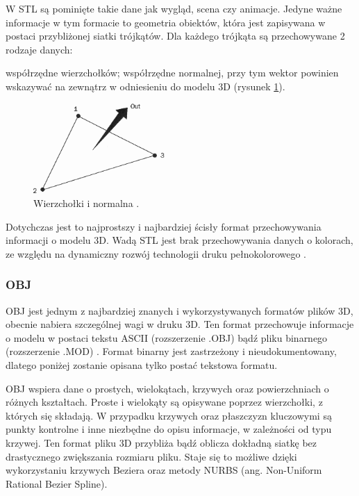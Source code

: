 W STL są pominięte takie dane jak wygląd, scena czy animacje. Jedyne ważne informacje w tym formacie to geometria obiektów, która jest zapisywana w postaci przybliżonej siatki trójkątów. Dla każdego trójkąta są przechowywane 2 rodzaje danych:
\begin{itemize}
\itemi współrzędne wierzchołków;
\itemi współrzędne normalnej, przy tym wektor powinien wskazywać na zewnątrz w odniesieniu do modelu 3D (rysunek \ref{rys6}).
\end{itemize}
\begin{figure}[H]
		\centering
 		\includegraphics[width=5.0cm]{vertices-and-normal.png}
    	\caption{Wierzchołki i normalna \cite{stlinfo}.}
 		\label{rys6}
\end{figure}
Dotychczas jest to najprostszy i najbardziej ścisły format przechowywania informacji o modelu 3D. Wadą STL jest brak przechowywania danych o kolorach, ze względu na dynamiczny rozwój technologii druku pełnokolorowego \cite{stlinfo}.

\subsubsection{OBJ}
OBJ jest jednym z najbardziej znanych i wykorzystywanych formatów plików 3D, obecnie nabiera szczególnej wagi w druku 3D. Ten format przechowuje informacje o modelu w postaci tekstu ASCII (rozszerzenie .OBJ) bądź pliku binarnego (rozszerzenie .MOD) \cite{objinfo}.
Format binarny jest zastrzeżony i nieudokumentowany, dlatego poniżej zostanie opisana tylko postać tekstowa formatu.

OBJ wspiera dane o prostych, wielokątach, krzywych oraz powierzchniach o różnych kształtach. Proste i wielokąty są opisywane poprzez wierzchołki, z których się składają. W przypadku krzywych oraz płaszczyzn kluczowymi są punkty kontrolne i inne niezbędne do opisu informacje, w zależności od typu krzywej. Ten format pliku 3D przybliża bądź oblicza dokładną siatkę bez drastycznego zwiększania rozmiaru pliku. Staje się to możliwe dzięki wykorzystaniu krzywych Beziera oraz metody NURBS (ang. Non-Uniform Rational Bezier Spline).

